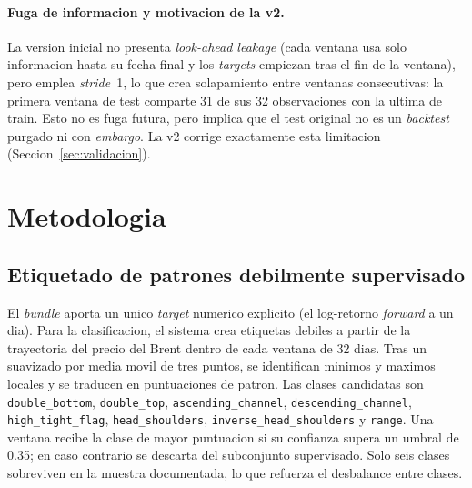 \documentclass[preprint,12pt,3p]{elsarticle}
\begin{document}
\paragraph{Fuga de informacion y motivacion de la v2.}
La version inicial no presenta \emph{look-ahead leakage} (cada ventana usa solo
informacion hasta su fecha final y los \emph{targets} empiezan tras el fin de la
ventana), pero emplea \emph{stride}~1, lo que crea solapamiento entre ventanas
consecutivas: la primera ventana de test comparte 31 de sus 32 observaciones con
la ultima de train. Esto no es fuga futura, pero implica que el test original no es
un \emph{backtest} purgado ni con \emph{embargo}. La v2 corrige exactamente esta
limitacion (Seccion~\ref{sec:validacion}).

\section{Metodologia}
\subsection{Etiquetado de patrones debilmente supervisado}
El \emph{bundle} aporta un unico \emph{target} numerico explicito (el log-retorno
\emph{forward} a un dia). Para la clasificacion, el sistema crea etiquetas debiles
a partir de la trayectoria del precio del Brent dentro de cada ventana de 32 dias.
Tras un suavizado por media movil de tres puntos, se identifican minimos y maximos
locales y se traducen en puntuaciones de patron. Las clases candidatas son
\texttt{double\_bottom}, \texttt{double\_top}, \texttt{ascending\_channel},
\texttt{descending\_channel}, \texttt{high\_tight\_flag}, \texttt{head\_shoulders},
\texttt{inverse\_head\_shoulders} y \texttt{range}. Una ventana recibe la clase de
mayor puntuacion si su confianza supera un umbral de 0.35; en caso contrario se
descarta del subconjunto supervisado. Solo seis clases sobreviven en la muestra
documentada, lo que refuerza el desbalance entre clases.
\end{document}
